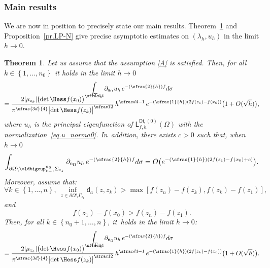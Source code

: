 \documentclass[JEP,XML,SOM,Unicode,NoEqCountersInSection,NoFloatCountersInSection,published]{cedram}
\newcommand{\Psfrac}[2]{(\sfrac{#1}{#2})}
\theoremstyle{plain}
\newtheorem{theorem}{Theorem}
\theoremstyle{definition}
\begin{document}
\subsubsection{Main results}
\label{ssec.mainresu}
We are now in position to precisely state our main results. Theorem~\ref{thm1} and Proposition~\ref{pr.LP-N} give precise
asymptotic estimates on $(\lambda_h,u_h)$ in the limit $h \to 0$.
\begin{theorem}\label{thm1}
Let us assume that the assumption \ref{A} is satisfied. Then, for all $k\in \left\{1,\ldots,n_0\right\}$ it holds in the limit $h\to 0$\vspace*{-5pt}
\begin{multline}\label{eq.dnuh_asymptot}
\int_{\Sigma_{z_k}}\partial_{\mathsf n_\Omega} u_h \, e^{-\Psfrac{2}{h} f} d\sigma\\[-10pt]
= \frac{ 2\vert \mu_{z_k}\vert \bigl(\det \Hess f (x_0) \bigr)^{\sfrac14} }{ \pi^{\sfrac{3d}{4}}\bigl\vert \det \Hess f (z_k) \bigr\vert^{\sfrac12}} \, h^{\sfrac d4 -1} \,e^{-\Psfrac{1}{h}(2f(z_1)-f(x_0))}\bigl(1+ O({\sqrt h}) \bigr),
\end{multline}
where $u_h$ is the principal eigenfunction of $\mathsf L^{\mathsf{Di},(0)}_{f,h}(\Omega)$ with the normalization~\eqref{eq.u_norma0}. In~addition, there exists $c>0$ such that, when $h\to 0$\vspace*{-3pt}
\begin{equation}\label{eq.dnuh_asymptot2}
\int_{\partial \Omega \setminus \oldbigcup_{k=1}^{n_0}\Sigma_{z_k}} \partial_{\mathsf n_\Omega} u_h \, e^{-\Psfrac{2}{h} f} d\sigma= O\bigl(e^{-\Psfrac{1}{h}(2f(z_1)-f(x_0)+c)} \bigr).
\end{equation}
Moreover, assume that:\vspace*{-3pt}
\begin{equation}
\label{hypo1}
\forall k\in \left\{1,\ldots,n\right\}, \ \inf_{z\in \partial \Omega\setminus \Gamma_{z_k}} \mathsf d_a(z,z_k) >\max[f(z_n)-f(z_k),f(z_k)-f(z_1)],
\end{equation}
and\vspace*{-3pt}
\begin{equation}
\label{hypo2}
f(z_1)-f(x_0)>f(z_n)-f(z_1).
\end{equation}
Then, for all $k\in \left\{n_0+1,\ldots,n\right\}$, it~holds in the limit $h\to 0$:\vspace*{-5pt}
\begin{multline}\label{eq.dnuh_asymptot3}
\int_{\Sigma_{z_k}}\partial_{\mathsf n_\Omega} u_h \,
e^{-\Psfrac{2}{h} f} d\sigma\\[-10pt]
=\frac{ 2\vert \mu_{z_k}\vert \bigl(\det \Hess f (x_0) \bigr)^{\sfrac14} }{ \pi^{\sfrac{3d}{4}}\bigl\vert \det \Hess f (z_k) \bigr\vert^{\sfrac12}} \, h^{\sfrac d4 -1} \,e^{-\Psfrac{1}{h}(2f(z_k)-f(x_0))}\bigl(1+ O({\sqrt h}) \bigr).
\end{multline}
\end{theorem}
\end{document}
